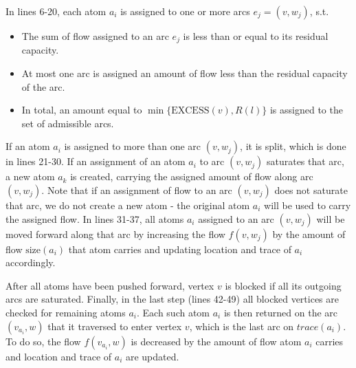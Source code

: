 \documentclass[a4paper,10pt, twocolumn]{article}
\begin{document}
In lines 6-20, each atom $a_i$ is assigned to one or more arcs $e_j = (v, w_j)$, s.t.
\begin{itemize}
	\item The sum of flow assigned to an arc $e_j$ is less than or equal to its residual capacity.
	\item At most one arc is assigned an amount of flow less than the residual capacity of the arc. 
	\item In total, an amount equal to $\min\{\mathrm{EXCESS}(v), R(l)\}$ is assigned to the set of admissible arcs.
\end{itemize}

If an atom $a_i$ is assigned to more than one arc $(v, w_j)$, it is split, which is done in lines 21-30. If an assignment of an atom $a_i$ to arc $(v, w_j)$ saturates that arc, a new atom $a_k$ is created, carrying the assigned amount of flow along arc $(v, w_j)$. Note that if an assignment of flow to an arc $(v, w_j)$ does not saturate that arc, we do not create a new atom - the original atom $a_i$ will be used to carry the assigned flow. In lines 31-37, all atoms $a_i$ assigned to an arc $(v, w_j)$ will be moved forward along that arc by increasing the flow $f(v, w_j)$ by the amount of flow $\mathrm{size}(a_i)$ that atom carries and updating location and trace of $a_i$ accordingly.

After all atoms have been pushed forward, vertex $v$ is blocked if all its outgoing arcs are saturated. Finally, in the last step (lines 42-49) all blocked vertices are checked for remaining atoms $a_i$. Each such atom $a_i$ is then returned on the arc $(v_{a_i}, w)$ that it traversed to enter vertex $v$, which is the last arc on $trace(a_i)$. To do so, the flow $f(v_{a_i}, w)$ is decreased by the amount of flow atom $a_i$ carries and location and trace of $a_i$ are updated.
\end{document}
